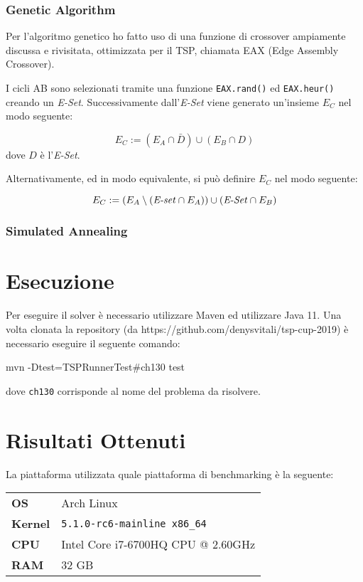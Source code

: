 \documentclass{article}
\newcommand{\mvar}[1]{\textrm{\textit{#1}}}
\newcommand{\ic}[1]{\texttt{#1}}
\begin{document}
\subsubsection{Genetic Algorithm}
Per l'algoritmo genetico ho fatto uso di una funzione di crossover ampiamente
discussa e rivisitata, ottimizzata per il TSP, chiamata EAX (Edge Assembly
Crossover).

I cicli AB sono selezionati tramite una funzione \ic{EAX.rand()} ed
\ic{EAX.heur()} creando un \mvar{E-Set}.
Successivamente dall'\mvar{E-Set} viene generato un'insieme $E_C$ nel modo seguente:

\begin{equation}
    E_C := (E_A \cap \bar{D}) \cup (E_B \cap D)
\end{equation}
dove $D$ è l'\mvar{E-Set}.

Alternativamente, ed in modo equivalente, si può definire $E_C$ nel modo seguente:

\begin{equation}
    E_C := (E_A \setminus (\mvar{E-set} \cap E_A)) \cup
    (\mvar{E-Set} \cap E_B)
\end{equation}

\subsubsection{Simulated Annealing}
\pagebreak
\section{Esecuzione}
Per eseguire il solver è necessario utilizzare Maven ed utilizzare Java 11.
Una volta clonata la repository (da https://github.com/denysvitali/tsp-cup-2019)
è necessario eseguire il seguente comando:
\begin{code}
    mvn -Dtest=TSPRunnerTest#ch130 test
\end{code}
dove \texttt{ch130} corrisponde al nome del problema da risolvere.

\section{Risultati Ottenuti}
La piattaforma utilizzata quale piattaforma di benchmarking è la seguente:

\begin{tabular}{|l|l|}
    \hline
    \textbf{OS}     & Arch Linux                          \\
    \textbf{Kernel} & \texttt{5.1.0-rc6-mainline x86\_64} \\
    \textbf{CPU}    & Intel Core i7-6700HQ CPU @ 2.60GHz  \\
    \textbf{RAM}    & 32 GB                               \\
    \hline
\end{tabular}
\end{document}
